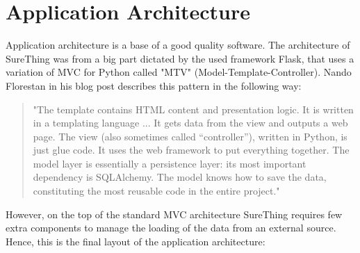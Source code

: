\section{Application Architecture}
\label{sec:applicationarchitecture}
Application architecture is a base of a good quality software. The architecture of SureThing was from a big part dictated by the used framework Flask, that uses a variation of MVC for Python called "MTV" (Model-Template-Controller). Nando Florestan \citet{article:goodArchitecture} in his blog post describes this pattern in the following way:

\begin{quote}
"The template contains HTML content and presentation logic. It is written in a templating language ... It gets data from the view and outputs a web page. The view (also sometimes called “controller”), written in Python, is just glue code. It uses the web framework to put everything together. The model layer is essentially a persistence layer: its most important dependency is SQLAlchemy. The model knows how to save the data, constituting the most reusable code in the entire project."
\end{quote}

However, on the top of the standard MVC architecture SureThing requires few extra components to manage the loading of the data from an external source. Hence, this is the final layout of the application architecture:

